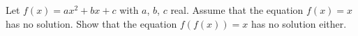 Let $f(x) = ax^2 + bx + c$ with $a$, $b$, $c$ real. Assume that the equation $f(x) = x$ has no solution. Show that the equation $f(f(x)) = x$ has no solution either.
